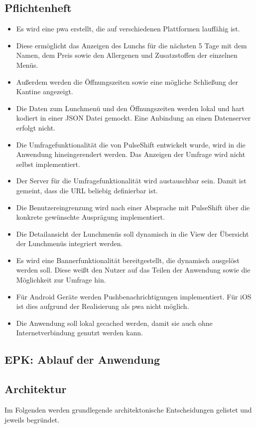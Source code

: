 \subsection{Pflichtenheft}

\begin{itemize}
\item Es wird eine \gls{pwa} erstellt, die auf verschiedenen Plattformen lauffähig ist. 
\item Diese ermöglicht das Anzeigen des Lunchs für die nächsten 5 Tage mit dem Namen, dem Preis sowie den Allergenen und Zusatzstoffen der einzelnen Menüs. 
\item Außerdem werden die Öffnungszeiten sowie eine mögliche Schließung der Kantine angezeigt.
\item Die Daten zum Lunchmenü und den Öffnungszeiten werden lokal und hart kodiert in einer JSON Datei gemockt. Eine Anbindung an einen Datenserver erfolgt nicht. 
\item Die Umfragefunktionalität die von PulseShift entwickelt wurde, wird in die Anwendung hineingerendert werden. Das Anzeigen der Umfrage wird nicht selbst implementiert. 
\item Der Server für die Umfragefunktionalität wird austauschbar sein. Damit ist gemeint, dass die URL beliebig definierbar ist.
\item Die Benutzereingrenzung wird nach einer Absprache mit PulseShift über die konkrete gewünschte Ausprägung implementiert.
\item Die Detailansicht der Lunchmenüs soll dynamisch in die View der Übersicht der Lunchmenüs integriert werden.
\item Es wird eine Bannerfunktionalität bereitgestellt, die dynamisch ausgelöst werden soll. Diese weißt den Nutzer auf das Teilen der Anwendung sowie die Möglichkeit zur Umfrage hin.
\item Für Android Geräte werden Pushbenachrichtigungen implementiert. Für iOS ist dies aufgrund der Realisierung als \gls{pwa} nicht möglich.
\item Die Anwendung soll lokal gecached werden, damit sie auch ohne Internetverbindung genutzt werden kann.
\end{itemize}

\subsection{EPK: Ablauf der Anwendung}

\subsection{Architektur}
Im Folgenden werden grundlegende architektonische Entscheidungen gelistet und jeweils begründet.

